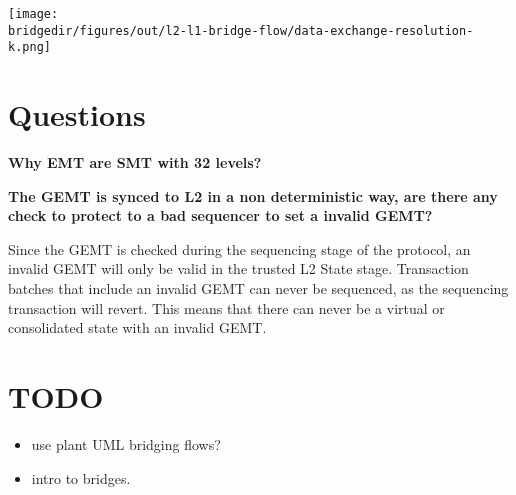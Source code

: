 \begin{center}
	\texttt{[image: \\bridgedir/figures/out/l2-l1-bridge-flow/data-exchange-resolution-k.png]}
	
	
\end{center}


\ifNOPOLYGON
\section{Questions}
\textbf{Why EMT are SMT with 32 levels?}

\textbf{The GEMT is synced to L2 in a non deterministic way, are there any check to protect to a bad sequencer to set a invalid GEMT?}

Since the GEMT is checked during the sequencing stage of the protocol, an invalid GEMT will only be valid in the trusted L2 State stage. Transaction batches that include an invalid GEMT can never be sequenced, as the sequencing transaction will revert. This means that there can never be a virtual or consolidated state with an invalid GEMT.


\section{TODO}
\begin{itemize}
	\item use plant UML bridging flows?
	\item intro to bridges.
\end{itemize}
\fi